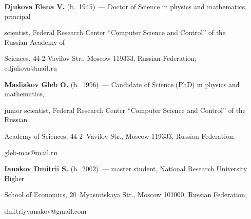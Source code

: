 \vspace*{-18pt}





\Contr





\vspace*{-3pt}





\noindent


\textbf{Djukova Elena V.} (b.\ 1945)~--- Doctor of Science in physics and mathematics, principal 


scientist, Federal Research Center ``Computer Science and Control'' of the Russian Academy of 


Sciences, 44-2 Vavilov Str., Moscow 119333, Russian Federation; \mbox{edjukova@mail.ru}





\vspace*{3pt}








\noindent


\textbf{Masliakov Gleb O.} (b.\ 1996)~--- Candidate of Science (PhD) in physics and mathematics, 


junior scientist, Federal Research Center ``Computer Science and Control'' of the Russian 


Academy of Sciences, 44-2~Vavilov Str., Moscow 119333, Russian Federation; 


\mbox{gleb-mas@mail.ru}





\vspace*{3pt}





\noindent


\textbf{Ianakov Dmitrii S.} (b.\ 2002)~--- master student, National Research University Higher 


School of Economics, 20~Myasnitskaya Str., Moscow 101000, Russian Federation; 


\mbox{dmitriyyanakov@gmail.com}











\label{end\stat}





\renewcommand{\bibname}{\protect\rm Литература} 


